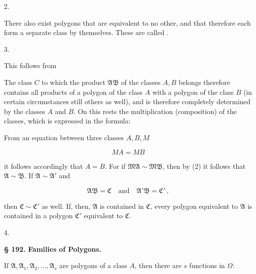 2. 

There also exist polygons that are equivalent to no other, and that therefore each form a separate class by themselves. These are called .

3. 

This follows from


The class $C$ to which the product $\mathfrak{A}\mathfrak{B}$ of the classes $A, B$ belongs therefore contains all products of a polygon of the class $A$ with a polygon of the class $B$ (in certain circumstances still others as well), and is therefore completely determined by the classes $A$ and $B$. On this rests the multiplication (composition) of the classes, which is expressed in the formula:


From an equation between three classes $A, B, M$

\[
MA = MB
\]

it follows accordingly that $A = B$. For if $\mathfrak{M}\mathfrak{A} \sim \mathfrak{M}\mathfrak{B}$, then by (2) it follows that $\mathfrak{A} \sim \mathfrak{B}$. If $\mathfrak{A} \sim \mathfrak{A}'$ and

\[
\mathfrak{A}\mathfrak{B} = \mathfrak{C} \quad \text{and} \quad \mathfrak{A}'\mathfrak{B} = \mathfrak{C}'\,,
\]

then $\mathfrak{C} \sim \mathfrak{C}'$ as well. If, then, $\mathfrak{A}$ is contained in $\mathfrak{C}$, every polygon equivalent to $\mathfrak{A}$ is contained in a polygon $\mathfrak{C}'$ equivalent to $\mathfrak{C}$.

4. 



\begin{center}
\textbf{§ 192. Families of Polygons.}
\end{center}

If $\mathfrak{A}, \mathfrak{A}_1, \mathfrak{A}_2, \ldots, \mathfrak{A}_s$ are polygons of a class $A$, then there are $s$ functions in $\Omega$:

